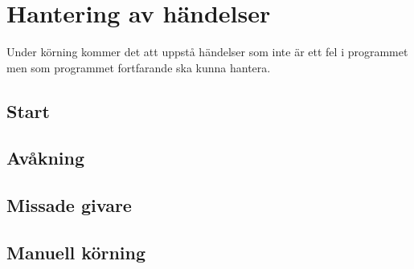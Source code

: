 \section{Hantering av händelser}

Under körning kommer det att uppstå händelser som inte är ett fel i
programmet men som programmet fortfarande ska kunna hantera.

\subsection{Start} 

\subsection{Avåkning} 

\subsection{Missade givare} 

\subsection{Manuell körning} 


